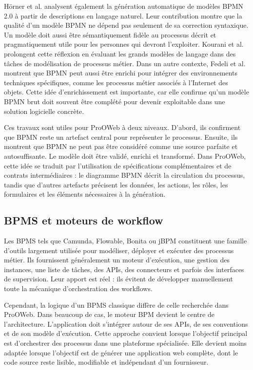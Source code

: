 \documentclass[12pt,a4paper]{article}
\begin{document}
Hörner et al. \cite{horner2026} analysent également la génération automatique de modèles BPMN 2.0 à partir de descriptions en langage naturel. Leur contribution montre que la qualité d'un modèle BPMN ne dépend pas seulement de sa correction syntaxique. Un modèle doit aussi être sémantiquement fidèle au processus décrit et pragmatiquement utile pour les personnes qui devront l'exploiter. Kourani et al. \cite{kourani2025} prolongent cette réflexion en évaluant les grands modèles de langage dans des tâches de modélisation de processus métier. Dans un autre contexte, Fedeli et al. \cite{fedeli2024} montrent que BPMN peut aussi être enrichi pour intégrer des environnements techniques spécifiques, comme les processus métier associés à l'Internet des objets. Cette idée d'enrichissement est importante, car elle confirme qu'un modèle BPMN brut doit souvent être complété pour devenir exploitable dans une solution logicielle concrète.

Ces travaux sont utiles pour ProOWeb à deux niveaux. D'abord, ils confirment que BPMN reste un artefact central pour représenter le processus. Ensuite, ils montrent que BPMN ne peut pas être considéré comme une source parfaite et autosuffisante. Le modèle doit être validé, enrichi et transformé. Dans ProOWeb, cette idée se traduit par l'utilisation de spécifications complémentaires et de contrats intermédiaires : le diagramme BPMN décrit la circulation du processus, tandis que d'autres artefacts précisent les données, les actions, les rôles, les formulaires et les éléments nécessaires à la génération.

\subsection{BPMS et moteurs de workflow}

Les BPMS tels que Camunda, Flowable, Bonita ou jBPM constituent une famille d'outils largement utilisée pour modéliser, déployer et exécuter des processus métier. Ils fournissent généralement un moteur d'exécution, une gestion des instances, une liste de tâches, des APIs, des connecteurs et parfois des interfaces de supervision. Leur apport est réel : ils évitent de développer manuellement toute la mécanique d'orchestration des workflows.

Cependant, la logique d'un BPMS classique diffère de celle recherchée dans ProOWeb. Dans beaucoup de cas, le moteur BPM devient le centre de l'architecture. L'application doit s'intégrer autour de ses APIs, de ses conventions et de son modèle d'exécution. Cette approche convient lorsque l'objectif principal est d'orchestrer des processus dans une plateforme spécialisée. Elle devient moins adaptée lorsque l'objectif est de générer une application web complète, dont le code source reste lisible, modifiable et indépendant d'un fournisseur.
\end{document}
